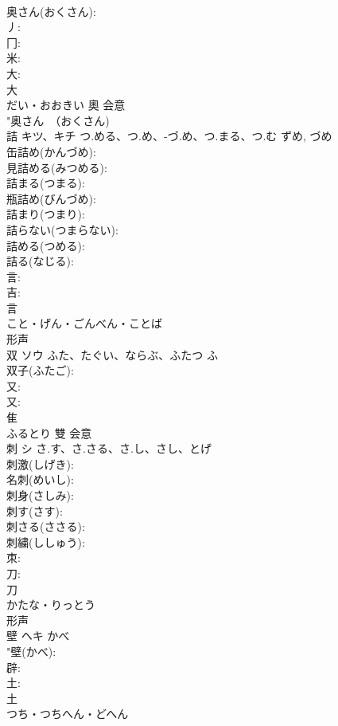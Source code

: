 \documentclass[8pt]{extreport}
\begin{document}
\begin{CJK}{UTF8}{min}
\\	奥さん(おくさん): 
\\	丿: 
\\	冂: 
\\	米: 
\\	大: 
\\	大	
\\	だい・おおきい	奧	会意 
\\	"奥さん　（おくさん) 
\\	詰	キツ、キチ	つ.める、つ.め、-づ.め、つ.まる、つ.む	ずめ, づめ	
\\	缶詰め(かんづめ): 
\\	見詰める(みつめる): 
\\	詰まる(つまる): 
\\	瓶詰め(びんづめ): 
\\	詰まり(つまり): 
\\	詰らない(つまらない): 
\\	詰める(つめる): 
\\	詰る(なじる): 
\\	言: 
\\	吉: 
\\	言	
\\	こと・げん・ごんべん・ことば	
\\	形声 
\\	双	ソウ	ふた、たぐい、ならぶ、ふたつ	ふ	
\\	双子(ふたご): 
\\	又: 
\\	又: 
\\	隹	
\\	ふるとり	雙	会意 
\\	刺	シ	さ.す、さ.さる、さ.し、さし、とげ		
\\	刺激(しげき): 
\\	名刺(めいし): 
\\	刺身(さしみ): 
\\	刺す(さす): 
\\	刺さる(ささる): 
\\	刺繍(ししゅう): 
\\	朿: 
\\	刀: 
\\	刀	
\\	かたな・りっとう	
\\	形声 
\\	壁	ヘキ	かべ		
\\	"壁(かべ): 
\\	辟: 
\\	土: 
\\	土	
\\	つち・つちへん・どへん	

\end{CJK}
\end{document}
